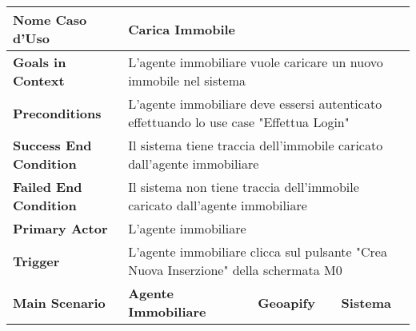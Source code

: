     \begin{longtable}{|m{4cm}|m{4cm}|m{3cm}|m{4cm}|}
        \hline
        \textbf{Nome Caso d'Uso} & \multicolumn{3}{p{11cm}|}{Carica Immobile} \\
        \hline
        \textbf{Goals in Context}
        & \multicolumn{3}{p{11cm}|}{L'agente immobiliare vuole caricare un nuovo immobile nel sistema} \\
        \hline
        \textbf{Preconditions}
        & \multicolumn{3}{p{11cm}|}{L'agente immobiliare deve essersi autenticato effettuando lo use case "Effettua Login"} \\
        \hline
        \textbf{Success End Condition}
        & \multicolumn{3}{p{11cm}|}{Il sistema tiene traccia dell'immobile caricato dall'agente immobiliare} \\
        \hline
        \textbf{Failed End Condition}
        & \multicolumn{3}{p{11cm}|}{Il sistema non tiene traccia dell'immobile caricato dall'agente immobiliare} \\
        \hline
        \textbf{Primary Actor}
        & \multicolumn{3}{p{11cm}|}{L'agente immobiliare} \\
        \hline
        \textbf{Trigger}
        & \multicolumn{3}{p{11cm}|}{L'agente immobiliare clicca sul pulsante "Crea Nuova Inserzione" della schermata M0} \\
        \hline

        \textbf{Main Scenario} & \textbf{Agente Immobiliare} & \textbf{Geoapify} & \textbf{Sistema} \\


\end{longtable}
